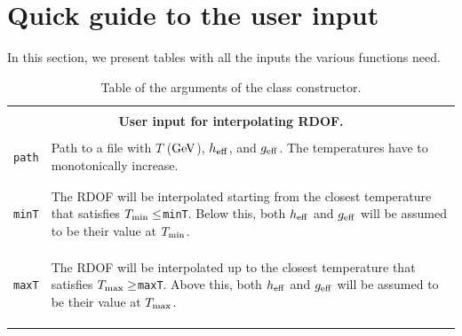 \documentclass[11pt,a4paper]{article}
\begin{document}
\section{Quick guide to the user input}\label{app:usr_input}
\setcounter{equation}{0}
In this section, we  present tables with all the inputs the various functions need.
%
\begin{table}[h!]
	\centering
	\begin{tabular}{l l}
		
		\hline\\[-0.4cm]
		\multicolumn{2}{c}{\bf User input for interpolating RDOF.}  \\
		\hline\\[-0.4cm]
		
		{\tt path} & \multirow{1}{12cm}{Path to a file with $T$ (${\rm GeV}$), $h_{\rm eff}{}$, and $g_{\rm eff}{}$. The temperatures have to monotonically increase.}\\\\
		\hline\\[-0.4cm]
		
		{\tt minT} & \multirow{1}{12cm}{The RDOF will be interpolated starting from the closest temperature that satisfies $T_{\rm min}\leq${\tt minT}. Below this, both $h_{\rm eff}{}$ and $g_{\rm eff}{}$ will be assumed to be their value at $T_{\rm min}$.}\\\\\\
		\hline\\[-0.4cm]
		
		{\tt maxT} & \multirow{1}{12cm}{The RDOF will be interpolated up to the closest temperature that satisfies $T_{\rm max}\geq${\tt maxT}. Above this, both $h_{\rm eff}{}$ and $g_{\rm eff}{}$ will be assumed to be their value at $T_{\rm max}$.}\\\\\\
		\hline\\[-0.4cm]
	\end{tabular}
	\caption{Table of the arguments of the  class constructor.}
	\label{tab:Cosmo-input}
\end{table}
%
\end{document}
